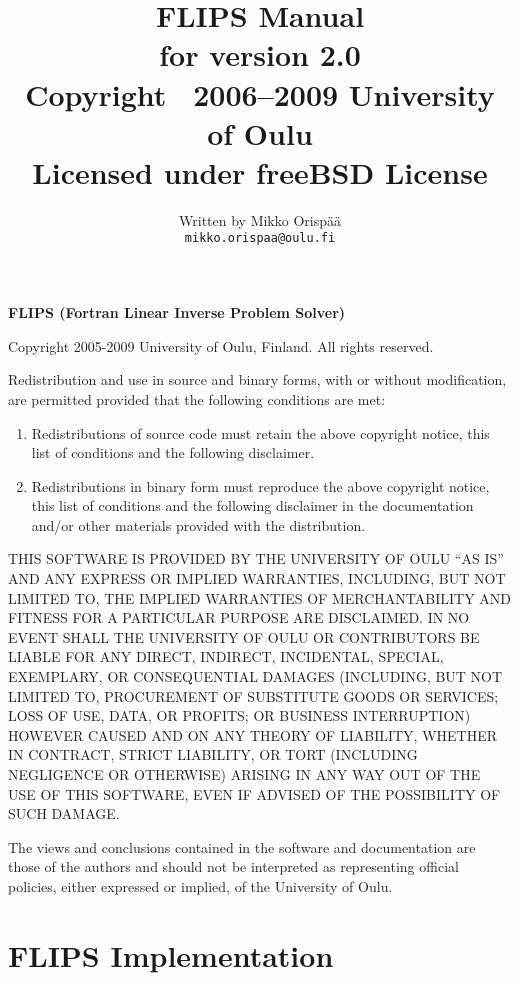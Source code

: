 \documentclass[a4paper,twoside]{refrep}
\title{FLIPS Manual\\
	for version 2.0\\[2cm]
	{\Large Copyright \textcopyright\ 2006--2009 University of Oulu}\\
	{\Large Licensed under freeBSD License}}
\author{Written by Mikko Orisp\"a\"a\\
	{\tt mikko.orispaa@oulu.fi}}
\date{}
\begin{document}
\begin{fullpage}
\maketitle
\end{fullpage}


{\Large\bfseries FLIPS (Fortran Linear Inverse Problem Solver)}

Copyright 2005-2009 University of Oulu, Finland. All rights reserved.

Redistribution and use in source and binary forms, with or without modification, 
are permitted provided that the following conditions are met:
\begin{enumerate}
   \item Redistributions of source code must retain the above copyright notice, this 
      list of conditions and the following disclaimer.
   \item Redistributions in binary form must reproduce the above copyright notice, this list 
      of conditions and the following disclaimer in the documentation and/or other materials 
      provided with the distribution.
\end{enumerate}

\begin{flushleft}
THIS SOFTWARE IS PROVIDED BY THE UNIVERSITY OF OULU ``AS IS'' AND ANY EXPRESS OR IMPLIED 
WARRANTIES, INCLUDING, BUT NOT LIMITED TO, THE IMPLIED WARRANTIES OF MERCHANTABILITY AND 
FITNESS FOR A PARTICULAR PURPOSE ARE DISCLAIMED. IN NO EVENT SHALL THE UNIVERSITY OF OULU 
OR CONTRIBUTORS BE LIABLE FOR ANY DIRECT, INDIRECT, INCIDENTAL, SPECIAL, EXEMPLARY, OR 
CONSEQUENTIAL DAMAGES (INCLUDING, BUT NOT LIMITED TO, PROCUREMENT OF SUBSTITUTE GOODS 
OR SERVICES; LOSS OF USE, DATA, OR PROFITS; OR BUSINESS INTERRUPTION) HOWEVER CAUSED AND 
ON ANY THEORY OF LIABILITY, WHETHER IN CONTRACT, STRICT LIABILITY, OR TORT (INCLUDING 
NEGLIGENCE OR OTHERWISE) ARISING IN ANY WAY OUT OF THE USE OF THIS SOFTWARE, EVEN IF 
ADVISED OF THE POSSIBILITY OF SUCH DAMAGE.

The views and conclusions contained in the software and documentation are those of 
the authors and should not be interpreted as representing official policies, either 
expressed or implied, of the University of Oulu.
\end{flushleft}


\tableofcontents

\part{FLIPS Implementation}
\end{document}

